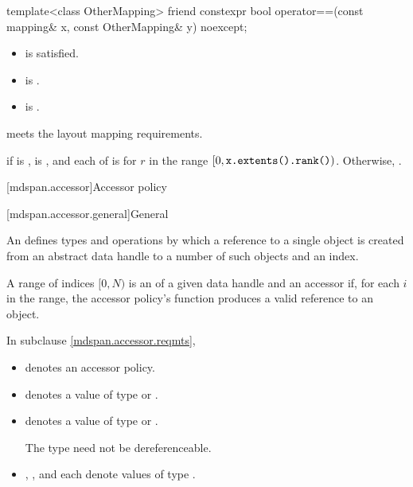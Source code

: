%
\begin{itemdecl}
template<class OtherMapping>
  friend constexpr bool operator==(const mapping& x, const OtherMapping& y) noexcept;
\end{itemdecl}

\begin{itemdescr}
\pnum
\constraints
\begin{itemize}
\item
{} is satisfied.
\item
{} is .
\item
{} is .
\end{itemize}

\pnum
\expects
{} meets the layout mapping requirements.

\pnum
\returns
{} if  is ,
 is , and
each of  is 
for $r$ in the range  $[0, \texttt{x.extents().rank()})$.
Otherwise, .
\end{itemdescr}

[mdspan.accessor]{Accessor policy}

[mdspan.accessor.general]{General}

\pnum
An  defines types and operations by which
a reference to a single object is created
from an abstract data handle to a number of such objects and an index.

\pnum
A range of indices $[0, N)$ is an  of
a given data handle and an accessor
if, for each $i$ in the range,
the accessor policy's  function produces a valid reference to an object.

\pnum
In subclause \ref{mdspan.accessor.reqmts},

\begin{itemize}
\item
{} denotes an accessor policy.
\item
{} denotes a value of type  or .
\item
{} denotes a value of type  or .
\begin{note}
The type  need not be dereferenceable.
\end{note}
\item
{}, , and  each denote values of type .
\end{itemize}

